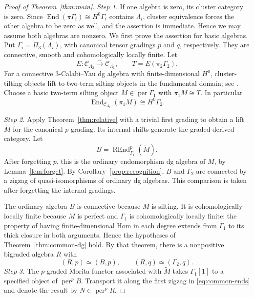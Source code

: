 \documentclass[12pt,a4paper,english,reqno]{amsart}
\theoremstyle{plain}
\theoremstyle{definition}
\numberwithin{equation}{section}
\newcommand{\thmref}[1]{Theorem~\ref{#1}}
\newcommand{\corref}[1]{Corollary~\ref{#1}}
\newcommand{\lemref}[1]{Lemma~\ref{#1}}
\def\Ga{\Gamma}
\def\La{\Lambda}
\def\End{\operatorname{End}}
\def\perf{\operatorname{per}}
\def\calC{{\mathcal C}}
\def\iso{\cong}
\def\ya#1{\xrightarrow{#1}}
\def\REnd{\operatorname{REnd}}
\newcommand{\uREnd}{\underline{\REnd}}
\begin{document}
\begin{proof}[Proof of \thmref{thm:main}]
\noindent\emph{Step 1.}
If one algebra is zero, its cluster category is zero. Since $\End(\pi\Ga_i)\iso H^0\Ga_i$ contains $\La_i$, cluster equivalence forces the other algebra to be zero as well, and the assertion is immediate. Hence we may assume both algebras are nonzero. We first prove the assertion for basic algebras. Put $\Ga_i=\Pi_3(\La_i)$, with canonical tensor gradings $p$ and $q$, respectively. They are connective, smooth and cohomologically locally finite. Let
\[
 E:\calC_{\La_2}\ya{\sim}\calC_{\La_1},
 \qquad T=E(\pi_2\Ga_2).
\]
For a connective $3$-Calabi--Yau dg algebra with finite-dimensional $H^0$, cluster-tilting objects lift to two-term silting objects in the fundamental domain; see \cite[Theorem 5.2]{HI}. Choose a basic two-term silting object $M\in\perf\Ga_1$ with $\pi_1M\iso T$. In particular
\[
 \End_{\calC_{\La_1}}(\pi_1M)\iso H^0\Ga_2.
\]

\medskip\noindent\emph{Step 2.}
Apply \thmref{thm:relative} with a trivial first grading to obtain a lift $\widetilde M$ for the canonical $p$-grading. Its internal shifts generate the graded derived category. Let
\[
 B=\uREnd^p_{\Ga_1}(\widetilde M).
\]
After forgetting $p$, this is the ordinary endomorphism dg algebra of $M$, by \lemref{lem:forget}. By \corref{prop:recognition}, $B$ and $\Ga_2$ are connected by a zigzag of quasi-isomorphisms of ordinary dg algebras. This comparison is taken after forgetting the internal gradings.

The ordinary algebra $B$ is connective because $M$ is silting. It is cohomologically locally finite because $M$ is perfect and $\Ga_1$ is cohomologically locally finite: the property of having finite-dimensional Hom in each degree extends from $\Ga_1$ to its thick closure in both arguments. Hence the hypotheses of \thmref{thm:common-dg} hold. By that theorem, there is a nonpositive bigraded algebra $R$ with
\begin{equation}\label{eq:common-ends}
 (R,p)\simeq(B,p),\qquad (R,q)\simeq(\Ga_2,q).
\end{equation}
\medskip\noindent\emph{Step 3.}
The $p$-graded Morita functor associated with $\widetilde M$ takes $\Ga_1[1]$ to a specified object of $\perf^pB$. Transport it along the first zigzag in \eqref{eq:common-ends} and denote the result by $N\in\perf^pR$.


\end{proof}
\end{document}
